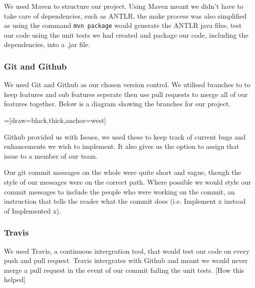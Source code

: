\documentclass[11pt,a4paper]{article}
\begin{document}
We used Maven to structure our project. Using Maven meant we didn't have to take care of dependencies, such as ANTLR, the make process was also simplified as using the command \texttt{mvn package} would generate the ANTLR java files, test our code using the unit tests we had created and package our code, including the dependencies, into a .jar file.


\subsubsection{Git and Github}
\label{subs:Git and Github}

We used Git and Github as our chosen version control. We utilised branches to to keep features and sub features seperate then use pull requests to merge all of our features together. Below is a diagram showing the branches for our project.

=[draw=black,thick,anchor=west]

Github provided us with Issues, we used these to keep track of current bugs and enhancements we wish to implement. It also gives us the option to assign that issue to a member of our team.

Our git commit messages on the whole were quite short and vague, though the style of our messages were on the correct path. Where possible we would style our commit messages to include the people who were working on the commit, an instruction that tells the reader what the commit does (i.e. Implement x instead of Implemented x).

\subsubsection{Travis}
\label{subs:Travis}
We used Travis, a continuous intergration tool, that would test our code on every push and pull request. Travis intergrates with Github and meant we would never merge a pull request in the event of our commit failing the unit tests. [How this helped]
\end{document}
